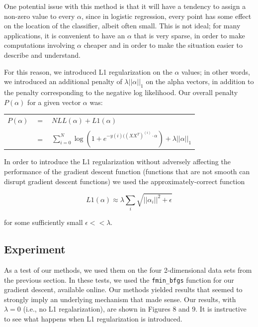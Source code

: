 \documentclass{sigchi}
\begin{document}

One potential issue with this method is that it will have a tendency to assign a non-zero value to every $\alpha$, since in logistic regression, every point has some effect on the location of the classifier, albeit often small. This is not ideal; for many applications, it is convenient to have an $\alpha$ that is very sparse, in order to make computations involving $\alpha$ cheaper and in order to make the situation easier to describe and understand. 

For this reason, we introduced L1 regularization on the $\alpha$ values; in other words, we introduced an additional penalty of $\lambda ||\alpha||_1$ on the alpha vectors, in addition to the penalty corresponding to the negative log likelihood. Our overall penalty $P(\alpha)$ for a given vector $\alpha$ was: 

\begin{center}
\begin{tabular}{r c l}
$P(\alpha)$&$=$&$\displaystyle NLL(\alpha) + L1(\alpha)$\\
&&\\
&$=$&$\displaystyle \sum_{i=0}^N \log(1+e^{-y{(i)}((XX^T)^{(i)} \cdot \alpha}) + \lambda||\alpha||_1$\\
\end{tabular}
\end{center}

In order to introduce the L1 regularization without adversely affecting the performance of the gradient descent function (functions that are not smooth can disrupt gradient descent functions) we used the approximately-correct function 

$$L1(\alpha) \approx \lambda \sum_i \sqrt{||\alpha_i||^2 + \epsilon}$$

for some sufficiently small $\epsilon << \lambda$. 

\subsection{Experiment}

As a test of our methods, we used them on the four 2-dimensional data sets from the previous section. In these tests, we used the \texttt{fmin\_bfgs} function for our gradient descent, available online. Our methods yielded results that seemed to strongly imply an underlying mechanism that made sense. Our results, with $\lambda = 0$ (i.e., no L1 regalarization), are shown in Figures 8 and 9. It is instructive to see what happens when L1 regularization is introduced.
\end{document}
